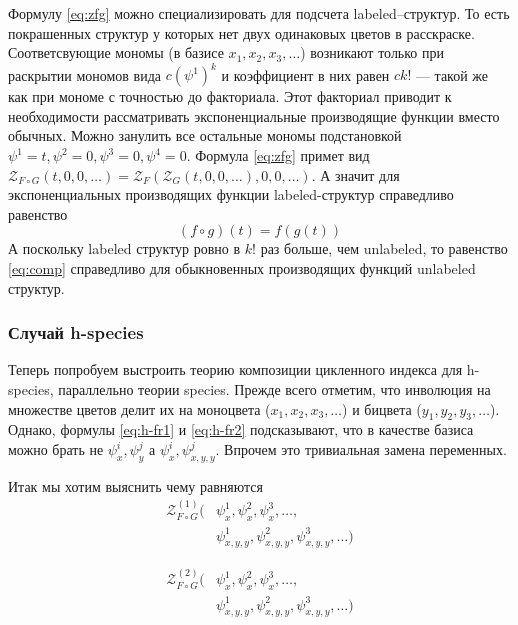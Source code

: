 Формулу \ref{eq:zfg} можно специализировать для подсчета labeled--структур. То
есть покрашенных структур у которых нет двух одинаковых цветов в расскраске.
Соответсвующие мономы (в базисе $x_1, x_2, x_3, \dots$) возникают только при
раскрытии мономов вида $c(\psi^1)^k$ и коэффициент в них равен $ck!$ --- такой
же как при мономе с точностью до факториала. Этот факториал приводит к
необходимости рассматривать экспоненциальные производящие функции вместо
обычных. Можно занулить все остальные мономы подстановкой $\psi^1 = t, \psi^2 =
0, \psi^3 = 0, \psi^4 = 0$. Формула \ref{eq:zfg} примет вид $
\mathcal Z_{F \circ G} (t, 0, 0, \dots) =
	\mathcal Z_F(
		\mathcal Z_G(t, 0, 0, \dots), 0, 0, \dots
	)
$.
А значит для экспоненциальных производящих функции labeled-структур справедливо
равенство
\begin{equation}
\label{eq:comp}
(f \circ g) (t) = f(g(t))
\end{equation}
А поскольку labeled структур ровно в $k!$ раз больше, чем unlabeled, то
равенство \ref{eq:comp} справедливо для обыкновенных производящих функций
unlabeled структур.

\subsubsection{Случай h-species}
Теперь попробуем выстроить теорию композиции цикленного индекса для h-species,
параллельно теории species. Прежде всего отметим, что инволюция на множестве
цветов делит их на моноцвета ($x_1, x_2, x_3, \dots$) и бицвета ($y_1, y_2,
y_3, \dots$). Однако, формулы \ref{eq:h-fr1} и \ref{eq:h-fr2} подсказывают, что
в качестве базиса можно брать не $\psi_x^i, \psi_y^j$ а $\psi_x^i, \psi_{x,y,y}^j$. Впрочем это
тривиальная замена переменных.

Итак мы хотим выяснить чему равняются
\begin{equation*}
\begin{split}
\mathcal Z^{(1)}_{F \circ G} (&\psi_x^1, \psi_x^2, \psi_x^3, \dots, \\
						&\psi_{x,y,y}^1, \psi_{x,y,y}^2, \psi_{x,y,y}^3, \dots)
\end{split}
\end{equation*}

\begin{equation*}
\begin{split}
\mathcal Z^{(2)}_{F \circ G} (&\psi_x^1, \psi_x^2, \psi_x^3, \dots, \\
						&\psi_{x,y,y}^1, \psi_{x,y,y}^2, \psi_{x,y,y}^3, \dots)
\end{split}
\end{equation*}

